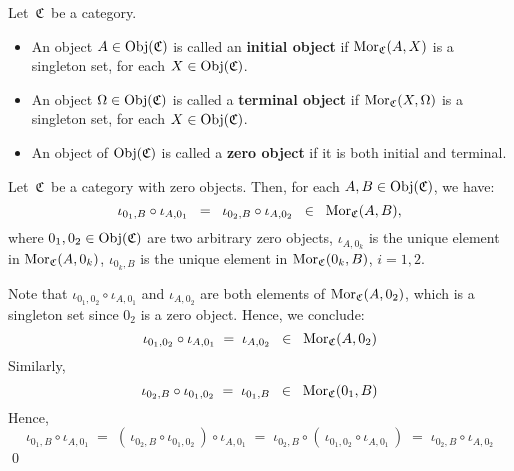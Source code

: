 
\vskip 0.5cm
\begin{definition}
\mbox{}
\vskip 0.15cm
\noindent
Let \,$\mathfrak{C}$\, be a category.
\begin{itemize}
\item
	An object $A \in \textnormal{Obj}(\mathfrak{C})$ is called an \textbf{initial object} if $\textnormal{Mor}_{\mathfrak{C}}(A,X)$ is a singleton set,
	for each $X \in \textnormal{Obj}(\mathfrak{C})$.
\item
	An object $\Omega \in \textnormal{Obj}(\mathfrak{C})$ is called a \textbf{terminal object} if $\textnormal{Mor}_{\mathfrak{C}}(X,\Omega)$ is a singleton set,
	for each $X \in \textnormal{Obj}(\mathfrak{C})$.
\item
	An object of $\textnormal{Obj}(\mathfrak{C})$ is called a \textbf{zero object} if it is both initial and terminal.
\end{itemize}
\end{definition}


\vskip 0.5cm
\begin{lemma}\label{ZeroMorphisms}
\mbox{}
\vskip 0.15cm
\noindent
Let \,$\mathfrak{C}$\, be a category with zero objects.
Then, for each $A, B \in \textnormal{Obj}(\mathfrak{C})$, we have:
\begin{equation*}
\iota_{0_{1},B}\circ\iota_{A,0_{1}}
\;\; = \;\;
	\iota_{0_{2},B}\circ\iota_{A,0_{2}}
\;\; \in \;\;
	\textnormal{Mor}_{\mathfrak{C}}(A,B),
\end{equation*}
where
$0_{1}, 0_{2} \in \textnormal{Obj}(\mathfrak{C})$ are two arbitrary zero objects,
$\iota_{A,0_{k}}$ is the unique element in $\textnormal{Mor}_{\mathfrak{C}}(A,0_{k})$,
$\iota_{0_{k},B}$ is the unique element in $\textnormal{Mor}_{\mathfrak{C}}(0_{k},B)$,
$i = 1,2$.
\end{lemma}
\proof
Note that $\iota_{0_{1},0_{2}}\circ\iota_{A,0_{1}}$ and $\iota_{A,0_{2}}$ are both elements of $\textnormal{Mor}_{\mathfrak{C}}(A,0_{2})$,
which is a singleton set since $0_{2}$ is a zero object. Hence, we conclude:
\begin{equation*}
\iota_{0_{1},0_{2}}\circ\iota_{A,0_{1}} \; = \; \iota_{A,0_{2}} \;\; \in \;\; \textnormal{Mor}_{\mathfrak{C}}(A,0_{2})
\end{equation*}
Similarly,
\begin{equation*}
\iota_{0_{2},B}\circ\iota_{0_{1},0_{2}} \; = \; \iota_{0_{1},B} \;\; \in \;\; \textnormal{Mor}_{\mathfrak{C}}(0_{1},B)
\end{equation*}
Hence,
\begin{equation*}
\iota_{0_{1},B} \circ \iota_{A,0_{1}}
\; = \;
	(\,\iota_{0_{2},B}\circ\iota_{0_{1},0_{2}}\,) \circ \iota_{A,0_{1}}
\; = \;
	\iota_{0_{2},B} \circ (\,\iota_{0_{1},0_{2}} \circ \iota_{A,0_{1}}\,)
\; = \;
	\iota_{0_{2},B} \circ \iota_{A,0_{2}}
\end{equation*}
\qed

